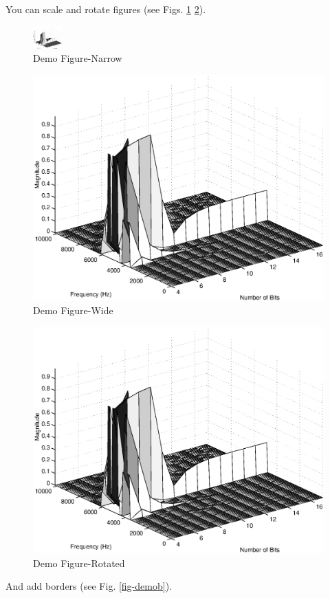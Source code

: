 \documentclass[a4paper,12pt]{report}
\begin{document}
You can scale and rotate figures (see Figs. \ref{fig-demon} \ref{fig-demow}).

\begin{figure}[t]
\centerline{\includegraphics[width=0.1\textwidth]{fig1.eps}}
\caption{Demo Figure-Narrow}
\label{fig-demon}
\end{figure}

\begin{figure}[t]
\centerline{\includegraphics[width=\textwidth]{fig1.eps}}
\caption{Demo Figure-Wide}
\label{fig-demow}
\end{figure}

\begin{figure}[t]
\centerline{\includegraphics[width=.5\textwidth,angle=45]{fig1.eps}}
\caption{Demo Figure-Rotated}
\label{fig-demo45}
\end{figure}

And add borders (see Fig. \ref{fig-demob}).
\end{document}

